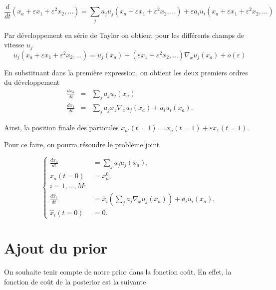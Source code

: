 \documentclass{article}
\begin{document}
\begin{equation*}
    \frac{d}{dt}(x_a + \varepsilon x_1 + \varepsilon^2 x_2, \dots) = \sum_j a_j u_j(x_a + \varepsilon x_1 + \varepsilon^2 x_2, \dots) + \varepsilon a_i u_i (x_a + \varepsilon x_1 + \varepsilon^2 x_2, \dots)
\end{equation*}

Par développement en série de Taylor on obtient pour les différents champs de vitesse $u_j$
\begin{equation*}
    u_j(x_a + \varepsilon x_1 + \varepsilon^2 x_2, \dots) = u_j(x_a) + (\varepsilon x_1 + \varepsilon^2 x_2, \dots) \nabla_x u_j (x_a) + o(\varepsilon)
\end{equation*}

En substituant dans la première expression, on obtient les deux premiers ordres du développement
\begin{eqnarray*}
    \frac{dx_a}{dt} &=&    \sum_j a_j u_j(x_a) \\
    \frac{dx_1}{dt} &=&   \sum_j a_j x_1 \nabla_x u_j(x_a) + a_i u_i(x_a).
\end{eqnarray*}

Ainsi, la position finale des particules $x_{a'}(t = 1) = x_{a}(t = 1) + \varepsilon x_1(t=1)$.

Pour ce faire, on pourra résoudre le problème joint

\begin{equation*}
    \begin{cases}
        \frac{dx_a}{dt}      & =  \sum_j a_j u_j(x_a),                                     \\
        x_a(t=0)             & =  x_a^0,                                                   \\
        i = 1, \dots, M:                                                                   \\
        \frac{d\hat x_i}{dt} & =  \hat x_i (\sum_j a_j  \nabla_x u_j(x_a)) + a_i u_i(x_a), \\
        \hat x_i(t=0)        & =  0.
    \end{cases}
\end{equation*}

\section{Ajout du prior}
On souhaite tenir compte de notre prior dans la fonction coût. En effet, la fonction de coût de la posterior est la suivante
\end{document}

